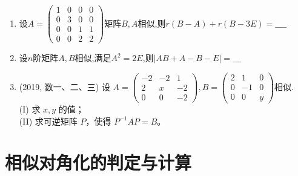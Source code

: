 \documentclass[12pt, a4paper, oneside, UTF8]{ctexbook}
\begin{document}
\begin{enumerate}[label=\arabic*.,start=6]
    \item 设$A=\begin{pmatrix}
        1 & 0 & 0 & 0 \\
        0 & 3 & 0 & 0 \\
        0 & 0 & 1 & 1 \\
        0 & 0 & 2 & 2
    \end{pmatrix}$矩阵$B,A$相似,则$r(B-A)+r(B-3E)=\_\_\_\_$
    
    \begin{solution}
        \newpage
    \end{solution}

    \item 设$n$阶矩阵$A,B$相似,满足$A^2=2E$,则$\left|AB+A-B-E\right|=\_\_\_$
    
    \begin{solution}
        \newpage
    \end{solution}

    \item (2019, 数一、二、三) 设
    $
    A = \begin{pmatrix}
    -2 & -2 & 1 \\
    2 & x & -2 \\
    0 & 0 & -2
    \end{pmatrix},
    B = \begin{pmatrix}
    2 & 1 & 0 \\
    0 & -1 & 0 \\
    0 & 0 & y
    \end{pmatrix}
    $相似.\\
    (I) 求 $x, y$ 的值； \\
    (II) 求可逆矩阵 $P$，使得 $P^{-1}AP = B$。
    
    \begin{solution}
    \newpage
    \end{solution}
\end{enumerate}

\section{相似对角化的判定与计算}
\end{document}
